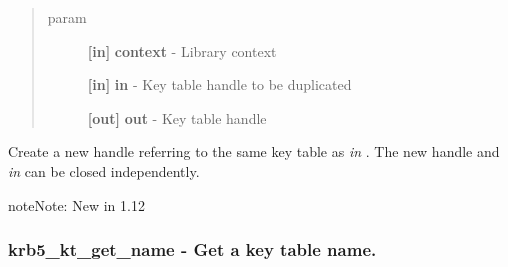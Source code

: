 \documentclass[letterpaper,10pt,english]{sphinxmanual}
\begin{document}
\begin{fulllineitems}
\label{appdev/refs/api/krb5_kt_dup:krb5_kt_dup}
\end{fulllineitems}

\begin{quote}\begin{description}
\item[{param}] \leavevmode
\textbf{{[}in{]}} \textbf{context} - Library context

\textbf{{[}in{]}} \textbf{in} - Key table handle to be duplicated

\textbf{{[}out{]}} \textbf{out} - Key table handle

\end{description}\end{quote}

Create a new handle referring to the same key table as \emph{in} . The new handle and \emph{in} can be closed independently.

\begin{notice}{note}{Note:}
New in 1.12
\end{notice}


\subsubsection{krb5\_kt\_get\_name -  Get a key table name.}
\label{appdev/refs/api/krb5_kt_get_name::doc}\label{appdev/refs/api/krb5_kt_get_name:krb5-kt-get-name-get-a-key-table-name}

\begin{fulllineitems}
\label{appdev/refs/api/krb5_kt_get_name:krb5_kt_get_name}
\end{fulllineitems}
\end{document}
